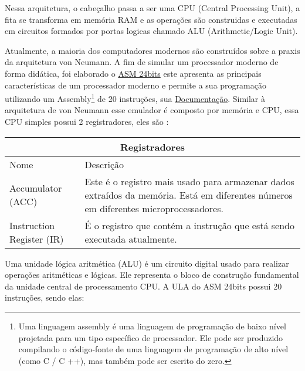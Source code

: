 Nessa arquitetura, o cabeçalho passa a ser uma CPU (Central Processing Unit), a fita se transforma em memória RAM e as operações são construidas e executadas em circuitos formados por portas logicas  chamado ALU (Arithmetic/Logic Unit). \cite{12}

Atualmente, a maioria dos computadores modernos são construídos sobre a praxis da arquitetura von Neumann. A fim de simular um processador moderno de forma didática, foi elaborado o \href{https://gzsig.io/vm-24bits/}{ASM 24bits} este apresenta as principais características de um processador moderno e permite a sua programação utilizando um Assembly\footnote{Uma linguagem assembly é uma linguagem de programação de baixo nível projetada para um tipo específico de processador. Ele pode ser produzido compilando o código-fonte de uma linguagem de programação de alto nível (como C / C ++), mas também pode ser escrito do zero.} de 20 instruções, sua \href{https://github.com/gzsig/Asm/blob/master/README.md}{Documentação}. Similar à arquitetura de von Neumann esse emulador é composto por memória e CPU, essa CPU simples possui 2 registradores, eles são :

\vspace{1cm}
\begin{longtable}{ |p{3cm}||p{11cm}|  }
  \hline
  \multicolumn{2}{|c|}{Registradores} \\
  \hline
    Nome &
    Descrição\\
  \hline
    Accumulator (ACC) &Este é o registro mais usado para armazenar dados extraídos da memória. Está em diferentes números em diferentes microprocessadores.\\
  \hline
    Instruction Register (IR) &É o registro que contém a instrução que está sendo executada atualmente.\\
  \hline
\end{longtable}
\vspace{1cm}

Uma unidade lógica aritmética (ALU) é um circuito digital usado para realizar operações aritméticas e lógicas. Ele representa o bloco de construção fundamental da unidade central de processamento CPU. A ULA do ASM 24bits possui 20 instruções, sendo elas:

